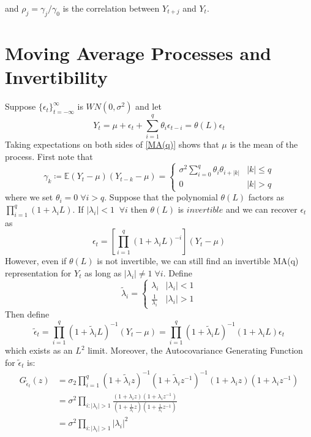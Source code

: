 \documentclass[11pt]{article}
\begin{document}
and $\rho_j = \gamma_j / \gamma_0$ is the correlation between $Y_{t+j}$ and $Y_t$.
\section{Moving Average Processes and Invertibility}
Suppose $\{ \epsilon_t \}_{t= - \infty}^{\infty}$ is $WN \left( 0 , \sigma^2 \right)$ and let
\begin{equation} \label{MA(q)}
Y_t = \mu + \epsilon_t + \sum_{i=1}^q \theta_i \epsilon_{t-i} =  \theta \left( L \right) \epsilon_t
\end{equation}
Taking expectations on both sides of \eqref{MA(q)} shows that $\mu$ is the mean of the process. 
First note that
\begin{equation}
\gamma_k \coloneqq \mathbb{E} \left( Y_t -\mu \right) \left( Y_{t-k} - \mu \right) = \left\{\begin{matrix}
\sigma^2 \sum_{i=0}^{q} \theta_i \theta_{i + |k|} & |k| \leq q \\ 
0 & |k| > q
\end{matrix}\right.
\end{equation}
where we set $\theta_i = 0 \; \forall i > q$. Suppose that the polynomial $\theta \left( L \right)$ factors as $\prod_{i=1}^q \left( 1 + \lambda_i L \right)$. If $|\lambda_i| < 1 \;\; \forall i$ then $\theta \left( L \right)$ is $invertible$ and we can recover $\epsilon_t$ as
$$\epsilon_t = \left[ \prod_{i=1}^q \left(1 + \lambda_i L \right)^{-i} \right] \left( Y_t - \mu \right)$$
However, even if $\theta \left( L \right)$ is not invertible, we can still find an invertible MA(q) representation for $Y_t$ as long as $|\lambda_i| \neq 1 \; \forall i$. Define
\begin{equation}
\widetilde{\lambda}_i = \left\{\begin{matrix}
\lambda_i & | \lambda_i | < 1 \\ 
\frac{1}{\lambda_i} & | \lambda_i | > 1
\end{matrix}\right.
\end{equation}
Then define
\begin{equation}
\widetilde{\epsilon}_t = \prod_{i=1}^q \left( 1 + \widetilde{\lambda}_i L \right)^{-1} \left( Y_t - \mu \right)
= \prod_{i=1}^q \left( 1 + \widetilde{\lambda}_i L \right)^{-1} \left( 1 + \lambda_i L \right) \epsilon_t
\end{equation}
which exists as an $L^2$ limit. Moreover, the Autocovariance Generating Function for $\widetilde{\epsilon}_t$ is:
\begin{equation}
\begin{split}
G_{\widetilde{\epsilon}_t} \left( z \right) & = \sigma_2 \prod_{i=1}^q
\left( 1 + \widetilde{\lambda}_i z \right)^{-1}
\left( 1 + \widetilde{\lambda}_i z^{-1} \right)^{-1}
\left( 1 + \lambda_i z \right)
\left( 1 + \lambda_i z^{-1} \right) \\
& = \sigma^2 \prod_{i: |\lambda_i| > 1} \frac{\left( 1 + \lambda_i z \right) \left( 1 + \lambda_i z^{-1} \right)}{
\left( 1 + \frac{1}{\lambda_i} z \right) \left( 1 + \frac{1}{\lambda_i} z^{-1} \right)}\\
& = \sigma^2 \prod_{i:|\lambda_i|>1}|\lambda_i|^2
\end{split}
\end{equation}
\end{document}
